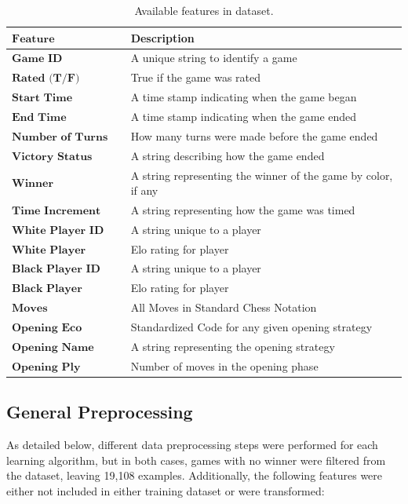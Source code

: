 \documentclass[12pt]{article}
\begin{document}
\begin{table}[H]
\centering
\begin{tabular}{|l|l|}
\hline
$\textbf{Feature}$ & Description \\ \hline
$\textbf{Game ID}$ & A unique string to identify a game \\ \hline
$\textbf{Rated (T/F)}$ & True if the game was rated \\ \hline
$\textbf{Start Time}$ & A time stamp indicating when the game began \\ \hline
$\textbf{End Time}$ & A time stamp indicating when the game ended \\ \hline
$\textbf{Number of Turns}$ & How many turns were made before the game ended \\ \hline
$\textbf{Victory Status}$ & A string describing how the game ended \\ \hline
$\textbf{Winner}$ & A string representing the winner of the game by color, if any \\ \hline
$\textbf{Time Increment}$ & A string representing how the game was timed \\ \hline
$\textbf{White Player ID}$ & A string unique to a player \\ \hline
$\textbf{White Player Rating}$ & Elo rating for player \\ \hline
$\textbf{Black Player ID}$ & A string unique to a player \\ \hline
$\textbf{Black Player Rating}$ & Elo rating for player \\ \hline
$\textbf{Moves}$ & All Moves in Standard Chess Notation \\ \hline
$\textbf{Opening Eco}$ & Standardized Code for any given opening strategy \\ \hline
$\textbf{Opening Name}$ & A string representing the opening strategy \\ \hline
$\textbf{Opening Ply}$ & Number of moves in the opening phase \\ \hline
\end{tabular}
\caption{Available features in dataset.}
\label{tab:features}
\end{table}

\subsection{General Preprocessing}
As detailed below, different data preprocessing steps were performed for each learning algorithm, but in both cases, games with no winner were filtered from the dataset, leaving 19,108 examples. Additionally, the following features were either not included in either training dataset or were transformed:
\end{document}

